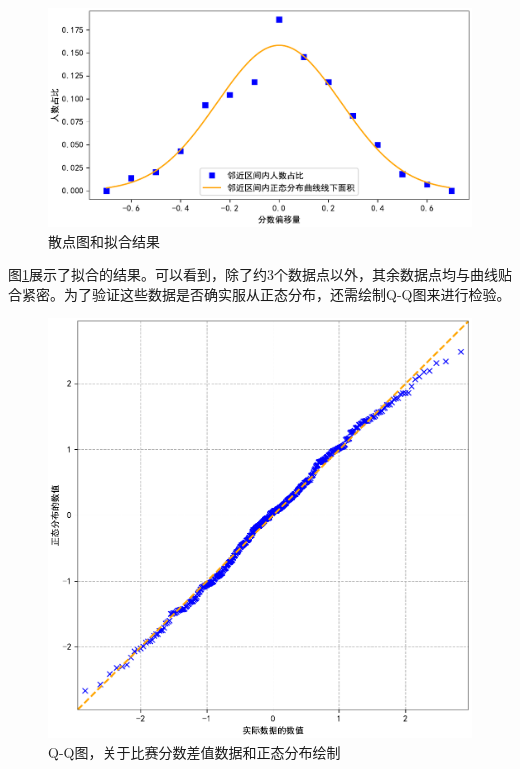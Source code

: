         \begin{figure}[htbp]
            \centering
            \includegraphics[width=\textwidth]{fig/fittingOffsets.pdf}
            \caption{散点图和拟合结果}
            \label{fig:fittingOffsetsByNormalDistribution}
        \end{figure}

        \vspace{1.5ex}

        图\ref{fig:fittingOffsetsByNormalDistribution}展示了拟合的结果。可以看到，除了约$3$个数据点以外，其余数据点均与曲线贴合紧密。为了验证这些数据是否确实服从正态分布，还需绘制Q-Q图来进行检验。

        \begin{figure}[hp]
            \centering
            \includegraphics[width=\textwidth]{fig/QQPlot.pdf}
            \caption{Q-Q图，关于比赛分数差值数据和正态分布绘制}
            \label{fig:QQPlot}
        \end{figure}

